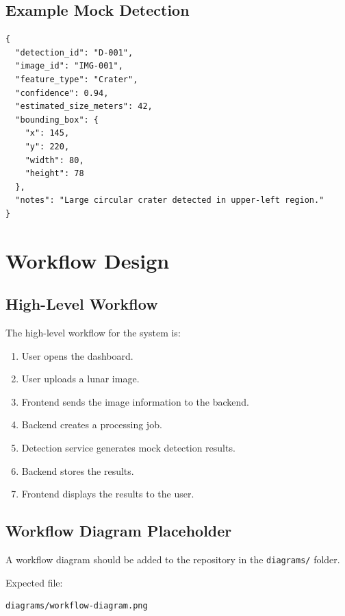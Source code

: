 \documentclass[12pt]{article}
\begin{document}
\subsection{Example Mock Detection}

\begin{verbatim}
{
  "detection_id": "D-001",
  "image_id": "IMG-001",
  "feature_type": "Crater",
  "confidence": 0.94,
  "estimated_size_meters": 42,
  "bounding_box": {
    "x": 145,
    "y": 220,
    "width": 80,
    "height": 78
  },
  "notes": "Large circular crater detected in upper-left region."
}
\end{verbatim}

\section{Workflow Design}

\subsection{High-Level Workflow}

The high-level workflow for the system is:

\begin{enumerate}
    \item User opens the dashboard.
    \item User uploads a lunar image.
    \item Frontend sends the image information to the backend.
    \item Backend creates a processing job.
    \item Detection service generates mock detection results.
    \item Backend stores the results.
    \item Frontend displays the results to the user.
\end{enumerate}

\subsection{Workflow Diagram Placeholder}

A workflow diagram should be added to the repository in the \texttt{diagrams/} folder.

Expected file:

\begin{verbatim}
diagrams/workflow-diagram.png
\end{verbatim}
\end{document}
